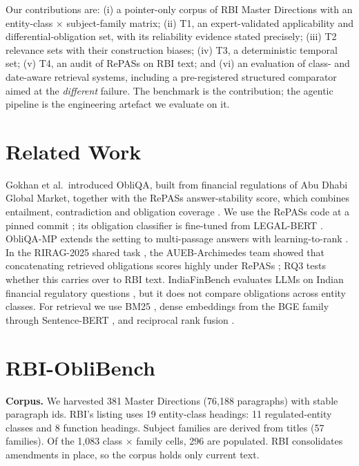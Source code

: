 \documentclass[conference]{IEEEtran}
\begin{document}
Our contributions are: (i) a pointer-only corpus of RBI Master Directions with an entity-class $\times$ subject-family matrix;
(ii) T1, an expert-validated applicability and differential-obligation set, with its reliability evidence stated precisely;
(iii) T2 relevance sets with their construction biases; (iv) T3, a deterministic temporal set; (v) T4, an audit of RePASs on
RBI text; and (vi) an evaluation of class- and date-aware retrieval systems, including a pre-registered structured comparator
aimed at the \textit{different} failure. The benchmark is the contribution; the agentic pipeline is the engineering artefact we
evaluate on it.

\section{Related Work}\label{sec:related}
Gokhan et al.\ introduced ObliQA, built from financial regulations of Abu Dhabi Global Market, together with the RePASs
answer-stability score, which combines entailment, contradiction and obligation coverage \cite{gokhan2024regnlp}. We use the
RePASs code at a pinned commit \cite{repass}; its obligation classifier is fine-tuned from LEGAL-BERT \cite{legalbert}.
ObliQA-MP extends the setting to multi-passage answers with learning-to-rank \cite{obliqamp}. In the RIRAG-2025 shared task
\cite{gokhan2025riragtask}, the AUEB-Archimedes team showed that concatenating retrieved obligations scores highly under RePASs
\cite{aueb2025rirag}; RQ3 tests whether this carries over to RBI text. IndiaFinBench evaluates LLMs on Indian financial
regulatory questions \cite{indiafinbench}, but it does not compare obligations across entity classes. For retrieval we use
BM25 \cite{bm25s}, dense embeddings from the BGE family \cite{bge} through Sentence-BERT \cite{sbert}, and reciprocal rank
fusion \cite{rrf}.

\section{RBI-ObliBench}\label{sec:bench}
\textbf{Corpus.} We harvested 381 Master Directions (76,188 paragraphs)
with stable paragraph ids. RBI's listing uses 19 entity-class headings:
11 regulated-entity classes and 8 function headings.
Subject families are derived from titles (57 families). Of the
1,083 class $\times$ family cells, 296 are populated.
RBI consolidates amendments in place, so the corpus holds only current text.
\end{document}
